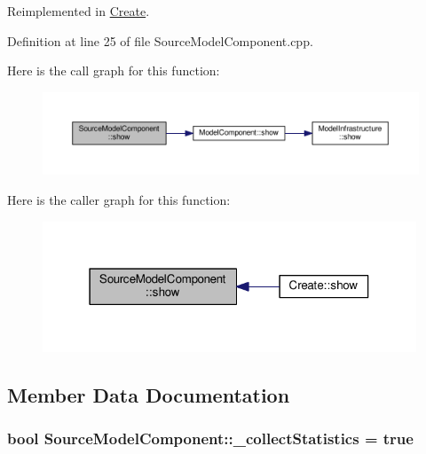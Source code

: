 Reimplemented in \hyperlink{class_create_a8d1832d2165bbeea4a5a88aded883f86}{Create}.



Definition at line 25 of file Source\-Model\-Component.\-cpp.



Here is the call graph for this function\-:\nopagebreak
\begin{figure}[H]
\begin{center}
\leavevmode
\includegraphics[width=350pt]{class_source_model_component_a4011597b5780fcc0495e8e22ab8158f6_cgraph}
\end{center}
\end{figure}




Here is the caller graph for this function\-:\nopagebreak
\begin{figure}[H]
\begin{center}
\leavevmode
\includegraphics[width=316pt]{class_source_model_component_a4011597b5780fcc0495e8e22ab8158f6_icgraph}
\end{center}
\end{figure}




\subsection{Member Data Documentation}
\hypertarget{class_source_model_component_ac0c009ff9a2e8169d251118dabcd19eb}{
\subsubsection[{\-\_\-collect\-Statistics}]{\setlength{\rightskip}{0pt plus 5cm}bool Source\-Model\-Component\-::\-\_\-collect\-Statistics = true\hspace{0.3cm}{\ttfamily [protected]}}}\label{class_source_model_component_ac0c009ff9a2e8169d251118dabcd19eb}


